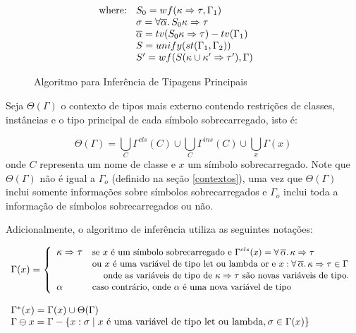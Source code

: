 \begin{figure}[h]
\begin{align}
       \text{where: }
          \begin{array}[t]{l}
		     S_0 = wf(\kappa\Rightarrow\tau,\Gamma_1) \\
			 \sigma = \forall \overline{\alpha}.\,S_0\kappa\Rightarrow \tau \\
			 \overline{\alpha}=tv(S_0\kappa\Rightarrow \tau)-tv(\Gamma_1) \\
             S = unify(st(\Gamma_1,\Gamma_2))\\
             S' = wf(S(\kappa \cup \kappa'\Rightarrow \tau'),\Gamma)
          \end{array} & \notag
\end{align}
\caption{Algoritmo para Infer\^encia de Tipagens Principais}
\label{figtypeinfer} 
\end{figure}



Seja $\Theta(\Gamma)$ o contexto de tipos mais externo contendo restri\c{c}\~oes de classes, inst\^ancias e o 
tipo principal de cada s\'imbolo sobrecarregado, isto \'e:

  \[ \Theta(\Gamma) =  
        \bigcup_C \Gamma^{cls}(C) \cup
        \bigcup_C \Gamma^{ins}(C) \cup 
        \bigcup_x \Gamma(x)
  \]
onde $C$ representa um nome de classe e $x$ um s\'imbolo sobrecarregado. Note que $\Theta(\Gamma)$ n\~ao \'e igual a 
$\Gamma_{o}$ (definido na se\c{c}\~ao \ref{contextos}), uma vez que $\Theta(\Gamma)$ inclui somente informa\c{c}\~oes
sobre s\'imbolos sobrecarregados e $\Gamma_{o}$ inclui toda a informa\c{c}\~ao de s\'imbolos sobrecarregados ou n\~ao.

Adicionalmente, o algoritmo de infer\^encia utiliza as seguintes nota\c{c}\~oes:

  \[ \begin{array}{l}
       \Gamma(x) = \left\{\begin{array}{ll}
          \kappa\Rightarrow \tau & \text{\small{se $x$ \'e um s\'imbolo sobrecarregado e 
		                                        $\Gamma^{cls}(x)=\forall\,\overline{\alpha}.\,\kappa\Rightarrow\tau$}}\\
		                         & \text{{\small ou $x$ \'e uma vari\'avel de tipo let ou lambda or e $x:\forall\,\overline{\alpha}.\,\kappa\Rightarrow\tau \in \Gamma$}} \\
	                             & \text{{\small \hspace{.3cm} onde as vari\'aveis de tipo de $\kappa\Rightarrow\tau$ 
	                             s\~ao novas vari\'aveis de tipo.}}\\
          \alpha         & \text{\small{caso contr\'ario, onde $\alpha$ \'e uma nova vari\'avel de tipo}}
     \end{array}\right. \\ \\
     \Gamma^*(x) = \Gamma(x) \cup \Theta(\Gamma)\\
     \Gamma \ominus x = \Gamma -\{ x:\sigma \mid \text{$x$ \'e uma vari\'avel de tipo let ou lambda}, \sigma\in \Gamma(x)\}
    \end{array}
  \]

